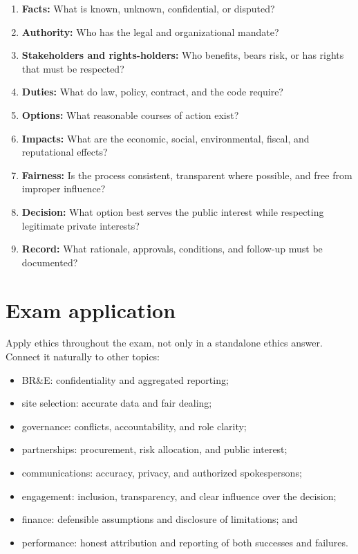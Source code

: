 \documentclass[11pt,letterpaper,oneside,openany]{book}
\begin{document}
\begin{enumerate}
\item \textbf{Facts:} What is known, unknown, confidential, or disputed?
\item \textbf{Authority:} Who has the legal and organizational mandate?
\item \textbf{Stakeholders and rights-holders:} Who benefits, bears risk, or has rights that must be respected?
\item \textbf{Duties:} What do law, policy, contract, and the code require?
\item \textbf{Options:} What reasonable courses of action exist?
\item \textbf{Impacts:} What are the economic, social, environmental, fiscal, and reputational effects?
\item \textbf{Fairness:} Is the process consistent, transparent where possible, and free from improper influence?
\item \textbf{Decision:} What option best serves the public interest while respecting legitimate private interests?
\item \textbf{Record:} What rationale, approvals, conditions, and follow-up must be documented?
\end{enumerate}


\section[Exam application]{Exam application}
Apply ethics throughout the exam, not only in a standalone ethics answer. Connect it naturally to other topics:


\begin{itemize}
\item BR\&E: confidentiality and aggregated reporting;
\item site selection: accurate data and fair dealing;
\item governance: conflicts, accountability, and role clarity;
\item partnerships: procurement, risk allocation, and public interest;
\item communications: accuracy, privacy, and authorized spokespersons;
\item engagement: inclusion, transparency, and clear influence over the decision;
\item finance: defensible assumptions and disclosure of limitations; and
\item performance: honest attribution and reporting of both successes and failures.
\end{itemize}
\end{document}
